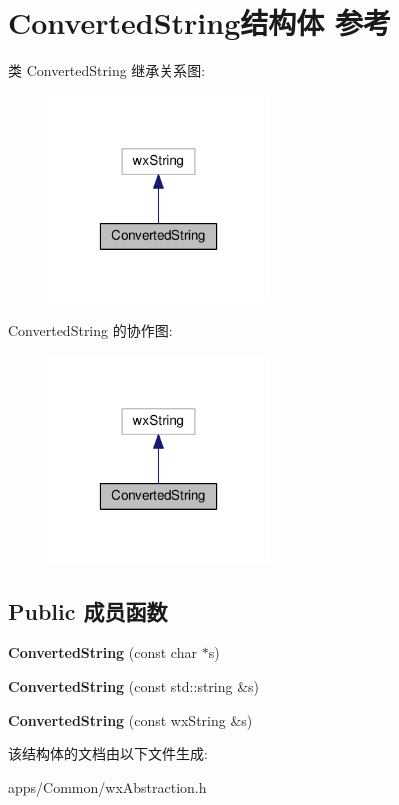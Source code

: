 \hypertarget{struct_converted_string}{\section{Converted\+String结构体 参考}
\label{struct_converted_string}
}


类 Converted\+String 继承关系图\+:
\nopagebreak
\begin{figure}[H]
\begin{center}
\leavevmode
\includegraphics[width=166pt]{struct_converted_string__inherit__graph}
\end{center}
\end{figure}


Converted\+String 的协作图\+:
\nopagebreak
\begin{figure}[H]
\begin{center}
\leavevmode
\includegraphics[width=166pt]{struct_converted_string__coll__graph}
\end{center}
\end{figure}
\subsection*{Public 成员函数}
\begin{DoxyCompactItemize}
\item 
\hypertarget{struct_converted_string_a9fe9f5b309008b5de1ceaea59c7fd946}{{\bfseries Converted\+String} (const char $\ast$s)}\label{struct_converted_string_a9fe9f5b309008b5de1ceaea59c7fd946}

\item 
\hypertarget{struct_converted_string_a9240583f7a8a4735783f9eb8d998c5e5}{{\bfseries Converted\+String} (const std\+::string \&s)}\label{struct_converted_string_a9240583f7a8a4735783f9eb8d998c5e5}

\item 
\hypertarget{struct_converted_string_a9e9aab0c8fcef7de71f833198dade695}{{\bfseries Converted\+String} (const wx\+String \&s)}\label{struct_converted_string_a9e9aab0c8fcef7de71f833198dade695}

\end{DoxyCompactItemize}


该结构体的文档由以下文件生成\+:\begin{DoxyCompactItemize}
\item 
apps/\+Common/wx\+Abstraction.\+h\end{DoxyCompactItemize}
